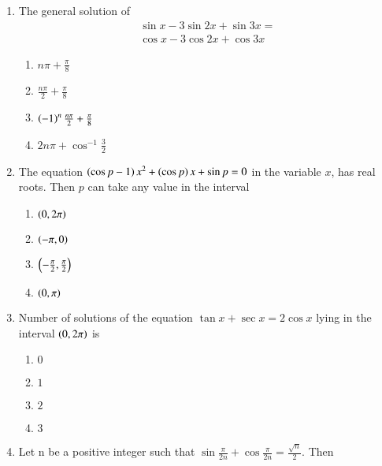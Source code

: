 \begin{enumerate}[label=\thesubsection.\arabic*,ref=\thesubsection.\theenumi]
    \item The general solution of 
	\begin{multline*}
		    \sin{x}-3\sin{2x} + \sin{3x} = \\\cos{x}-3\cos{2x} + \cos{3x}
	\end{multline*}
        
        \hfill{}
        \begin{enumerate}
                \item $n\pi+\frac{\pi}{8}$
                \item $\frac{n\pi}{2}+\frac{\pi}{8}$
                \item $\left(-1\right)^n\frac{n\pi}{2}+\frac{\pi}{8}$
                \item $2n\pi+\cos^{-1}{\frac{3}{2}}$
        \end{enumerate}


    \item The equation $\left(\cos{p}-1\right)x^2+\left(\cos{p}\right)x+\sin{p}=0$ in the variable $x$, has real roots. Then $p$ can take any value in the interval
        
        \hfill{}
        \begin{enumerate}
                \item $\left(0,2\pi\right)$
                \item $\left(-\pi,0\right)$
                \item $\left(-\frac{\pi}{2},\frac{\pi}{2}\right)$  
                \item $\left(0,\pi\right)$
        \end{enumerate}

    \item Number of solutions of the equation $\tan{x}+\sec{x} = 2\cos{x}$ lying in the interval $\left(0, 2\pi\right)$ is
        
        \hfill{}
        \begin{enumerate}
                \item $0$
                \item $1$
                \item $2$
                \item $3$
        \end{enumerate}


    \item Let n be a positive integer such that $\sin{\frac{\pi}{2n}} + \cos{\frac{\pi}{2n}} = \frac{\sqrt{n}}{2}$. Then
        

\end{enumerate}

